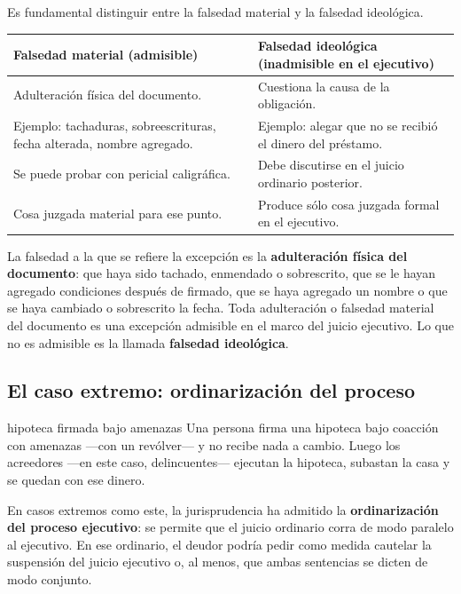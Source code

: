 \documentclass[12pt,oneside]{book}
\renewcommand{\arraystretch}{1.15}
\begin{document}
Es fundamental distinguir entre la falsedad material y la falsedad ideológica.

\begin{table}[H]
\centering
\renewcommand{\arraystretch}{1.25}
\begin{tabularx}{\textwidth}{Y Y}
\toprule
\textbf{Falsedad material (admisible)} & \textbf{Falsedad ideológica (inadmisible en el ejecutivo)} \\
\midrule
Adulteración física del documento. & Cuestiona la causa de la obligación. \\
Ejemplo: tachaduras, sobreescrituras, fecha alterada, nombre agregado. & Ejemplo: alegar que no se recibió el dinero del préstamo. \\
Se puede probar con pericial caligráfica. & Debe discutirse en el juicio ordinario posterior. \\
Cosa juzgada material para ese punto. & Produce sólo cosa juzgada formal en el ejecutivo. \\
\bottomrule
\end{tabularx}
\end{table}

La falsedad a la que se refiere la excepción es la \textbf{adulteración física del documento}: que haya sido tachado, enmendado o sobrescrito, que se le hayan agregado condiciones después de firmado, que se haya agregado un nombre o que se haya cambiado o sobrescrito la fecha. Toda adulteración o falsedad material del documento es una excepción admisible en el marco del juicio ejecutivo. Lo que no es admisible es la llamada \textbf{falsedad ideológica}.

\subsection{El caso extremo: ordinarización del proceso}

\begin{example}{hipoteca firmada bajo amenazas}
Una persona firma una hipoteca bajo coacción con amenazas ---con un revólver--- y no recibe nada a cambio. Luego los acreedores ---en este caso, delincuentes--- ejecutan la hipoteca, subastan la casa y se quedan con ese dinero.
\end{example}

En casos extremos como este, la jurisprudencia ha admitido la \textbf{ordinarización del proceso ejecutivo}: se permite que el juicio ordinario corra de modo paralelo al ejecutivo. En ese ordinario, el deudor podría pedir como medida cautelar la suspensión del juicio ejecutivo o, al menos, que ambas sentencias se dicten de modo conjunto.
\end{document}
